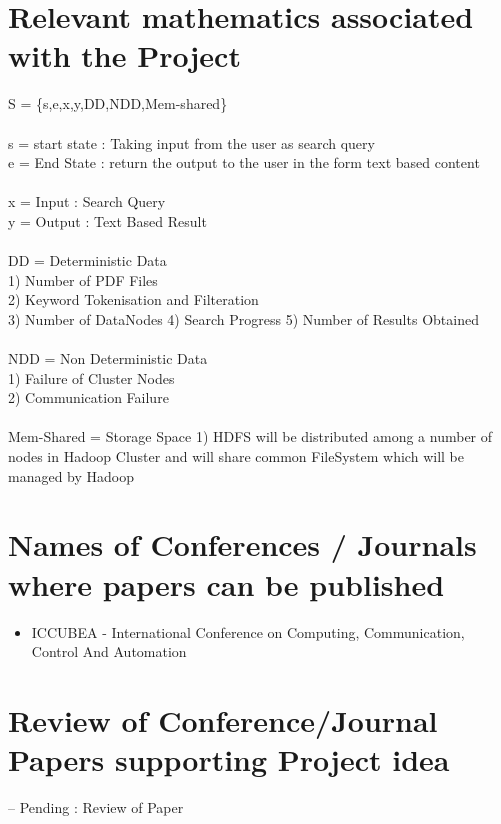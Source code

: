 \documentclass[oneside,a4paper,12pt]{report}
\begin{document}
\section{Relevant mathematics associated with the Project}
\noindent
S = \{s,e,x,y,DD,NDD,Mem-shared\} \\\\
s = start state : Taking input from the user as search query \\
e = End State : return the output to the user in the form text based content \\\\
x = Input : Search Query \\
y = Output : Text Based Result \\\\
DD = Deterministic Data \\
1) Number of PDF Files \\
2) Keyword Tokenisation and Filteration \\
3) Number of DataNodes 
4) Search Progress 
5) Number of Results Obtained \\\\
NDD = Non Deterministic Data \\
1) Failure of Cluster Nodes \\
2) Communication Failure  \\\\
Mem-Shared = Storage Space 
1) HDFS will be distributed among a number of nodes in Hadoop Cluster and will share common FileSystem which will be managed by Hadoop \\


\section{Names of Conferences / Journals where papers can be published}
\begin{itemize}
\item ICCUBEA - International Conference on Computing, Communication, Control And Automation
\end{itemize} 


\section{Review of Conference/Journal Papers supporting Project idea}
\label{sec:survey}
-- Pending : Review of Paper \\
\end{document}

